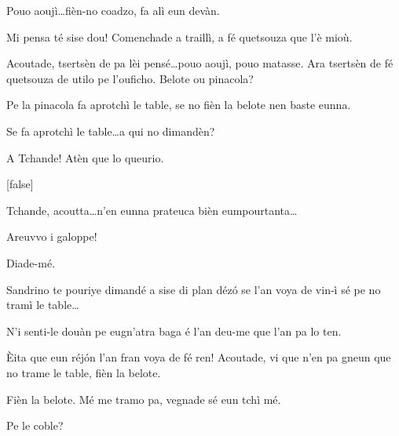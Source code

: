 \begin{drama}
\Richardspeaks Pouo aoujì\ldots fièn-no coadzo, fa alì eun devàn.

\Tuenospeaks Mi pensa té sise dou! Comenchade a traillì, a fé quetsouza que l'è mioù.


\Richardspeaks  Acoutade, tsertsèn de pa lèi pensé\ldots pouo aoujì, pouo matasse. Ara tsertsèn de fé quetsouza de utilo pe l'ouficho.  Belote ou pinacola?


\Gerominespeaks Pe la pinacola fa aprotchì le table, se no fièn la belote nen baste eunna.


\Saventaspeaks Se fa aprotchì le table\ldots a qui no dimandèn? 

\Tuenospeaks A Tchande! Atèn que lo queurio.


[false]\label{tel}


\Tuenospeaks Tchande, acoutta\ldots n'en eunna prateuca bièn eumpourtanta\ldots

\Sandrinospeaks Areuvvo i galoppe!


\Sandrinospeaks Diade-mé.

\Gerominespeaks Sandrino te pouriye dimandé a sise di plan déz\'o se l'an voya de vin-ì sé pe no tramì le table\ldots

\Sandrinospeaks N'i senti-le douàn pe eugn'atra baga é l'an deu-me que l'an pa lo ten.


\Richardspeaks \`Eita que eun réj\'on l'an fran voya de fé ren! Acoutade, vi que n'en pa gneun que no trame le table, fièn la belote.

\Tuenospeaks Fièn la belote. Mé me tramo pa, vegnade sé eun tchì mé.


\Gerominespeaks Pe le coble?


\end{drama}

